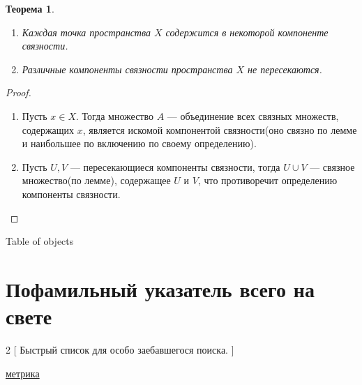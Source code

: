 \documentclass[a4paper,100pt]{article}
\theoremstyle{indented}
\newtheorem{theorem}{Теорема}
\begin{document}
    \begin{theorem}
        \begin{enumerate}
            \item Каждая точка пространства $X$ содержится в некоторой компоненте связности.
            \item Различные компоненты связности пространства $X$ не пересекаются.
        \end{enumerate}
    \end{theorem}
    
    \begin{proof} \textcolor{white}{-}\\
    \begin{enumerate}
        \item Пусть $x \in X$. Тогда множество $A$ --- объединение всех связных множеств, содержащих $x$, является искомой компонентой связности(оно связно по лемме и наибольшее по включению по своему определению).
        \item Пусть $U,V$ --- пересекающиеся компоненты связности, тогда $U \cup V$ --- связное множество(по лемме), содержащее $U$ и $V$, что противоречит определению компоненты связности.
    \end{enumerate}
    \end{proof}



\newpage

\hypertarget{t2}{Table of objects}



\section{Пофамильный указатель всего на свете}

\begin{multicols}{2}
    [
    Быстрый список для особо заебавшегося поиска.
    ]
    
    \hyperlink{n1}{метрика}

    \end{multicols}
\end{document}

